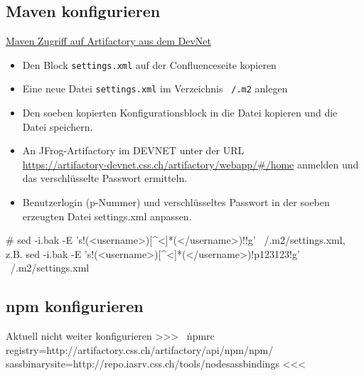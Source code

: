\documentclass[]{article}
\newcommand{\code}[1]{\texttt{#1}}
\begin{document}
\subsection{Maven konfigurieren}
\href{https://confluence.css.ch/confluence/display/TEA/Maven+Zugriff+auf+Artifactory+aus+dem+DevNet}{Maven Zugriff auf Artifactory aus dem DevNet}
\begin{itemize}
	\item Den Block \code{settings.xml} auf der Confluenceseite kopieren
	\item Eine neue Datei \code{settings.xml} im Verzeichnis \code{~/.m2} anlegen
	\item Den soeben kopierten Konfigurationsblock in die Datei kopieren und die Datei speichern.
	\item An JFrog-Artifactory im DEVNET unter der URL \\
	\url{https://artifactory-devnet.css.ch/artifactory/webapp/#/home}
	anmelden und das verschlüsselte Passwort ermitteln.
	\item Benutzerlogin (p-Nummer) und verschlüsseltes Passwort in der soeben erzeugten Datei settings.xml anpassen.
\end{itemize}

\begin{bashcode}
# sed -i.bak -E 's!(<username>)[^<]*(</username>)!\2!g' ~/.m2/settings.xml, z.B.
sed -i.bak -E 's!(<username>)[^<]*(</username>)!\1p123123\2!g' ~/.m2/settings.xml
\end{bashcode}

\subsection{npm konfigurieren}
Aktuell nicht weiter konfigurieren >>>
~\.npmrc
registry=http://artifactory.css.ch/artifactory/api/npm/npm/
sass\textunderscore binary\textunderscore site=http://repo.iasrv.css.ch/tools/node\textunderscore sass\textunderscore bindings
<<<

\printbibliography
\end{document}
